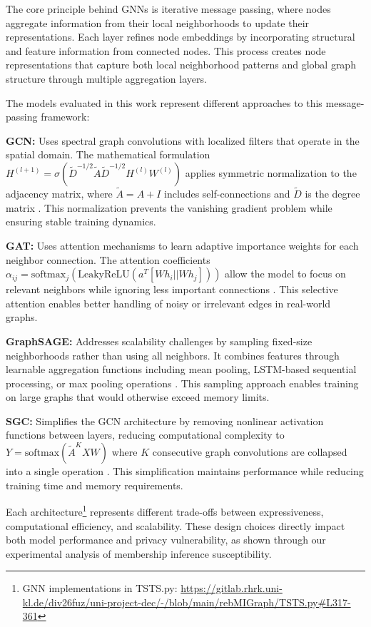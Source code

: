 \documentclass{article}
\begin{document}
The core principle behind GNNs is iterative message passing, where nodes aggregate information from their local neighborhoods to update their representations. Each layer refines node embeddings by incorporating structural and feature information from connected nodes. This process creates node representations that capture both local neighborhood patterns and global graph structure through multiple aggregation layers.

The models evaluated in this work represent different approaches to this message-passing framework:

\textbf{GCN:} Uses spectral graph convolutions with localized filters that operate in the spatial domain. The mathematical formulation $H^{(l+1)} = \sigma(\tilde{D}^{-1/2}\tilde{A}\tilde{D}^{-1/2}H^{(l)}W^{(l)})$ applies symmetric normalization to the adjacency matrix, where $\tilde{A} = A + I$ includes self-connections and $\tilde{D}$ is the degree matrix \cite{kipf2017semi}. This normalization prevents the vanishing gradient problem while ensuring stable training dynamics.

\textbf{GAT:} Uses attention mechanisms to learn adaptive importance weights for each neighbor connection. The attention coefficients $\alpha_{ij} = \text{softmax}_j(\text{LeakyReLU}(a^T[Wh_i||Wh_j]))$ allow the model to focus on relevant neighbors while ignoring less important connections \cite{velickovic2018graph}. This selective attention enables better handling of noisy or irrelevant edges in real-world graphs.

\textbf{GraphSAGE:} Addresses scalability challenges by sampling fixed-size neighborhoods rather than using all neighbors. It combines features through learnable aggregation functions including mean pooling, LSTM-based sequential processing, or max pooling operations \cite{hamilton2017inductive}. This sampling approach enables training on large graphs that would otherwise exceed memory limits.

\textbf{SGC:} Simplifies the GCN architecture by removing nonlinear activation functions between layers, reducing computational complexity to $Y = \text{softmax}(\tilde{A}^KXW)$ where $K$ consecutive graph convolutions are collapsed into a single operation \cite{wu2019simplifying}. This simplification maintains performance while reducing training time and memory requirements.

Each architecture\footnote{GNN implementations in TSTS.py: \url{https://gitlab.rhrk.uni-kl.de/div26fuz/uni-project-dec/-/blob/main/rebMIGraph/TSTS.py\#L317-361}} represents different trade-offs between expressiveness, computational efficiency, and scalability. These design choices directly impact both model performance and privacy vulnerability, as shown through our experimental analysis of membership inference susceptibility.
\end{document}
